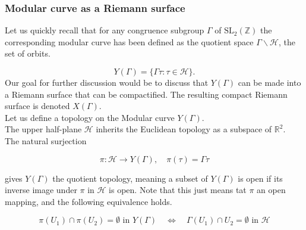 \subsubsection*{Modular curve as a Riemann surface}

Let us quickly recall that for any congruence subgroup $\Gamma$ of $\mathrm{SL}_{2}(\mathbb{Z})$ the corresponding modular curve has been defined as the quotient space $\Gamma \backslash \mathcal{H}$, the set of orbits.

$$
Y(\Gamma)=\{\Gamma \tau: \tau \in \mathcal{H}\}
.$$ Our goal for further discussion would be to discuss that $Y(\Gamma)$ can be made into a Riemann surface that can be compactified. The resulting compact Riemann surface is denoted $X(\Gamma)$. \\
Let us define a topology on the Modular curve $Y(\Gamma)$. \\The upper half-plane $\mathcal{H}$ inherits the Euclidean topology as a subspace of $\mathbb{R}^{2}$. \\The natural surjection

$$
\pi: \mathcal{H} \longrightarrow Y(\Gamma), \quad \pi(\tau)=\Gamma \tau
$$

gives $Y(\Gamma)$ the quotient topology, meaning a subset of $Y(\Gamma)$ is open if its inverse image under $\pi$ in $\mathcal{H}$ is open. Note that this just means tat $\pi$ an open mapping, and the following equivalence holds. 

\begin{lemma}\label{4.1.9}
$$
\pi\left(U_{1}\right) \cap \pi\left(U_{2}\right)=\emptyset \text { in } Y(\Gamma) \quad \Longleftrightarrow \quad \Gamma\left(U_{1}\right) \cap U_{2}=\emptyset \text { in } \mathcal{H}$$
    
\end{lemma}

